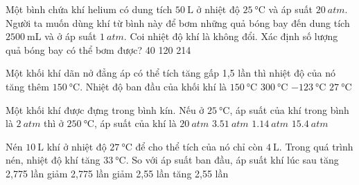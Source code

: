 \begin{ex}
	Một bình chứa khí helium có dung tích $\SI{50}{\liter}$ ở nhiệt độ $\SI{25}{\celsius}$ và áp suất $\SI{20}{atm}$. Người ta muốn dùng khí từ bình này để bơm những quả bóng bay đến dung tích $\SI{2500}{\milli\liter}$ và ở áp suất $\SI{1}{atm}$. Coi nhiệt độ khí là không đổi. Xác định số lượng quả bóng bay có thể bơm được?
	\choice
	{40}
	{120}
	{214}
	{}
	\loigiai{}
\end{ex}
\begin{ex}
	Một khối khí dãn nở đẳng áp có thể tích tăng gấp 1,5 lần thì nhiệt độ của nó tăng thêm $\SI{150}{\celsius}$. Nhiệt độ ban đầu của khối khí là
	\choice
	{$\SI{150}{\celsius}$}
	{$\SI{300}{\celsius}$}
	{$\SI{-123}{\celsius}$}
	{\True $\SI{27}{\celsius}$}
	\loigiai{}
\end{ex}
\begin{ex}
	Một khối khí được đựng trong bình kín. Nếu ở $\SI{25}{\celsius}$, áp suất của khí trong bình là $\SI{2}{atm}$ thì ở $\SI{250}{\celsius}$, áp suất của khí là
	\choice
	{$\SI{20}{atm}$}
	{\True $\SI{3.51}{atm}$}
	{$\SI{1.14}{atm}$}
	{$\SI{15.4}{atm}$}
	\loigiai{}
\end{ex}
\begin{ex}
	Nén $\SI{10}{\liter}$ khí ở nhiệt độ $\SI{27}{\celsius}$ để cho thể tích của nó chỉ còn $\SI{4}{\liter}$. Trong quá trình nén, nhiệt độ khí tăng $\SI{33}{\celsius}$. So với áp suất ban đầu, áp suất khí lúc sau
	\choice
	{\True tăng 2,775 lần}
	{giảm 2,775 lần}
	{giảm 2,55 lần}
	{tăng 2,55 lần}
\end{ex}

